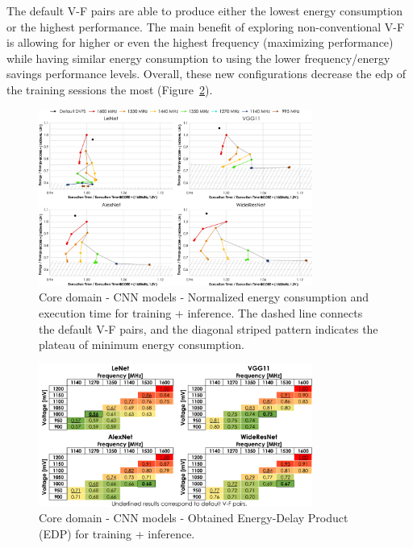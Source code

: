 The default V-F pairs are able to produce either the lowest energy consumption or the highest performance. 
The main benefit of exploring non-conventional V-F is allowing for higher or even the highest frequency (maximizing performance) while having similar energy consumption to using the lower frequency/energy savings performance levels.
Overall, these new configurations decrease the \acrshort{edp} of the training sessions the most (Figure~\ref{fig:CNN_EDP_training_inf}).



\begin{figure}[!htb]
    \centering
        \includegraphics[width=0.8\textwidth]{Figures/Application To Deep Learning/CNN_behaviour.pdf}
        \caption{Core domain - CNN models - Normalized energy consumption and execution time for training + inference. The dashed line connects the default V-F pairs, and the diagonal striped pattern indicates the plateau of minimum energy consumption.}
    \label{fig:CNN_Behaviour_training_inf}
\end{figure}

\begin{figure}[!htb]
    \centering
        \includegraphics[width=0.8\textwidth]{Figures/Application To Deep Learning/CNN_EDP.pdf}
        \caption{Core domain - CNN models - Obtained Energy-Delay Product (EDP) for training + inference.}
    \label{fig:CNN_EDP_training_inf}
\end{figure}

